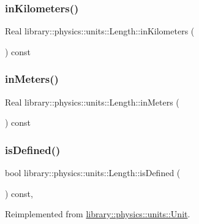 \subsubsection{\texorpdfstring{in\+Kilometers()}{inKilometers()}}
{\footnotesize\ttfamily Real library\+::physics\+::units\+::\+Length\+::in\+Kilometers (\begin{DoxyParamCaption}{ }\end{DoxyParamCaption}) const}

\mbox{\label{classlibrary_1_1physics_1_1units_1_1_length_ae8064733601131d3ccf1e5d53ecaf001}} 
\subsubsection{\texorpdfstring{in\+Meters()}{inMeters()}}
{\footnotesize\ttfamily Real library\+::physics\+::units\+::\+Length\+::in\+Meters (\begin{DoxyParamCaption}{ }\end{DoxyParamCaption}) const}

\mbox{\label{classlibrary_1_1physics_1_1units_1_1_length_a0249a542e7cc613e6a39275b4e37bd05}} 
\subsubsection{\texorpdfstring{is\+Defined()}{isDefined()}}
{\footnotesize\ttfamily bool library\+::physics\+::units\+::\+Length\+::is\+Defined (\begin{DoxyParamCaption}{ }\end{DoxyParamCaption}) const\hspace{0.3cm}{\ttfamily [override]}, {\ttfamily [virtual]}}



Reimplemented from \hyperlink{classlibrary_1_1physics_1_1units_1_1_unit_a5ce011c1ffa0fce4cf1f5d42ff06ee78}{library\+::physics\+::units\+::\+Unit}.

